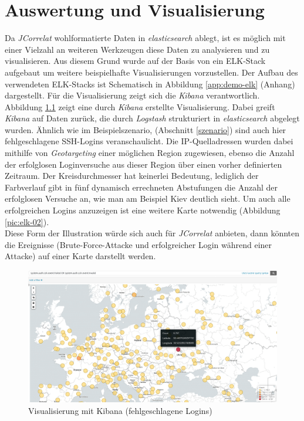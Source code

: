 \chapter{Auswertung und Visualisierung}\label{ausblick}
\thispagestyle{fancy}

Da \textit{JCorrelat} wohlformatierte Daten in \textit{elasticsearch} ablegt, ist es 
möglich mit einer Vielzahl an weiteren Werkzeugen diese Daten zu analysieren und zu 
visualisieren. Aus diesem Grund wurde auf der Basis von \cite{kleindienst} ein 
ELK-Stack aufgebaut um weitere beispielhafte Visualisierungen vorzustellen. Der 
Aufbau des verwendeten ELK-Stacks ist Schematisch in Abbildung \ref{app:demo-elk} (Anhang)
dargestellt. Für die Visualisierung zeigt sich die \textit{Kibana} verantwortlich.\\
Abbildung \ref{pic:elk-01} zeigt eine durch \textit{Kibana} erstellte Visualisierung. 
Dabei greift \textit{Kibana} auf Daten zurück, die durch \textit{Logstash} 
strukturiert in \textit{elasticsearch} abgelegt wurden.
Ähnlich wie im Beispielszenario, (Abschnitt \ref{szenario}) sind auch hier 
fehlgeschlagene SSH-Logins veranschaulicht. Die IP-Quelladressen wurden dabei 
mithilfe von \textit{Geotargeting} einer möglichen Region zugewiesen, ebenso die Anzahl 
der erfolglosen Loginversuche aus dieser Region über einen vorher definierten Zeitraum. 
Der Kreisdurchmesser hat keinerlei Bedeutung, lediglich der Farbverlauf gibt in fünf 
dynamisch errechneten Abstufungen die Anzahl der erfolglosen Versuche an, wie man am 
Beispiel Kiev deutlich sieht. Um auch alle erfolgreichen Logins anzuzeigen ist eine 
weitere Karte notwendig (Abbildung \ref{pic:elk-02}).\\
Diese Form der Illustration würde sich auch für \textit{JCorrelat} anbieten, dann 
könnten die Ereignisse (Brute-Force-Attacke und erfolgreicher Login während einer Attacke)
auf einer Karte darstellt werden.

\begin{figure}[htbp]
    \caption{Visualisierung mit Kibana (fehlgeschlagene Logins)}
    \label{pic:elk-01}\vspace{0.2cm}
    \centering
    \includegraphics[scale=0.28]{img/elk-01}  
\end{figure}

